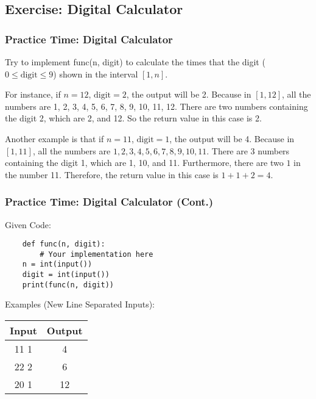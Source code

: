 \documentclass{beamer}
\begin{document}
\subsection{Exercise: Digital Calculator}
\begin{frame}[fragile]
    \frametitle{Practice Time: Digital Calculator}

    Try to implement func(n, digit) to calculate the times
    that the digit ($0 \le \text{digit} \le 9$) shown
    in the interval $[1, n]$.

    For instance, if $n = 12$, $\text{digit} = 2$, the output will be 2.
    Because in $[1, 12]$, all the numbers are 1, 2, 3, 4, 5, 6, 7, 8, 9, 10, 11, 12.
    There are two numbers containing the digit 2, which are 2, and 12.
    So the return value in this case is 2.

    Another example is that if $n = 11$, $\text{digit} = 1$, the output will be 4.
    Because in $[1, 11]$, all the numbers are $1, 2, 3, 4, 5, 6, 7, 8, 9, 10, 11$.
    There are 3 numbers containing the digit 1, which are 1, 10, and 11.
    Furthermore, there are two $1$ in the number 11.
    Therefore, the return value in this case is $1 + 1 + 2 = 4$.
\end{frame}

\begin{frame}[fragile]
    \frametitle{Practice Time: Digital Calculator (Cont.)}
    Given Code:
    \begin{verbatim}
    def func(n, digit):
        # Your implementation here
    n = int(input())
    digit = int(input())
    print(func(n, digit))
    \end{verbatim}

    Examples (New Line Separated Inputs):

    \begin{center}
        \begin{tabular}{|c|c|}
            \hline
            Input & Output \\ \hline
            11 1  & 4      \\ \hline
            22 2  & 6      \\ \hline
            20 1  & 12     \\ \hline
        \end{tabular}
    \end{center}
\end{frame}
\end{document}
